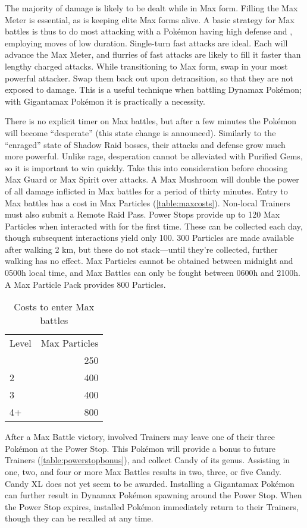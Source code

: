 The majority of damage is likely to be dealt while in Max form.
Filling the Max Meter is essential, as is keeping elite Max forms alive.
A basic strategy for Max battles is thus to do most attacking with a Pokémon having
  high defense and \MHP, employing moves of low duration.
Single-turn fast attacks are ideal.
Each will advance the Max Meter, and flurries of fast attacks are likely to
 fill it faster than lengthy charged attacks.
While transitioning to Max form, swap in your most powerful attacker.
Swap them back out upon detransition, so that they are not exposed to damage.
This is a useful technique when battling Dynamax Pokémon; with Gigantamax Pokémon it is practically a necessity.

There is no explicit timer on Max battles, but after a few minutes the Pokémon
  will become ``desperate'' (this state change is announced).
Similarly to the ``enraged'' state of Shadow Raid bosses, their attacks and
  defense grow much more powerful.
Unlike rage, desperation cannot be alleviated with Purified Gems, so it
  is important to win quickly.
Take this into consideration before choosing Max Guard or Max Spirit over attacks.
A Max Mushroom will double the power of all damage inflicted in
  Max battles for a period of thirty minutes.
Entry to Max battles has a cost in Max Particles (\autoref{table:maxcosts}).
Non-local Trainers must also submit a Remote Raid Pass.
Power Stops provide up to 120 Max Particles when interacted with for the first time.
These can be collected each day, though subsequent interactions yield only 100.
300 Particles are made available after walking 2 km, but these do not stack---until
 they're collected, further walking has no effect.
Max Particles cannot be obtained between midnight and 0500h local time,
  and Max Battles can only be fought between 0600h and 2100h.
A Max Particle Pack provides 800 Particles.
\begin{table}
\centering
\begin{tabular}{lr}
Level & Max Particles\\
\Midrule
  1 & 250\\
  2 & 400\\
  3 & 400\\
  4+ & 800\\
\end{tabular}
\caption{Costs to enter Max battles\label{table:maxcosts}}
\end{table}

After a Max Battle victory, involved Trainers may leave one of their three Pokémon at the Power Stop.
This Pokémon will provide a bonus to future Trainers (\autoref{table:powerstopbonus}), and
  collect Candy of its genus.
Assisting in one, two, and four or more Max Battles results in two, three, or five Candy.
Candy XL does not yet seem to be awarded.
Installing a Gigantamax Pokémon can further result in Dynamax Pokémon spawning around the Power Stop.
When the Power Stop expires, installed Pokémon immediately return to their Trainers,
  though they can be recalled at any time.


